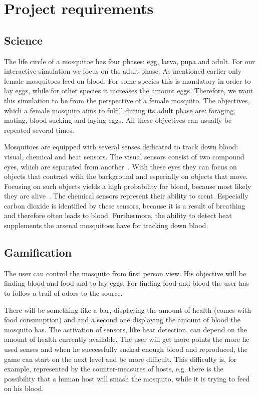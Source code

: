 \documentclass{acm_proc_article-sp}
\begin{document}
\section{Project requirements}

\subsection{Science}
The life circle of a mosquitoe has four phases: egg, larva, pupa and adult. For our interactive simulation we focus on the adult phase. As mentioned earlier only female mosquitoes feed on blood. For some species this is mandatory in order to lay eggs, while for other species it increases the amount eggs. Therefore, we want this simulation to be from the perspective of a female mosquito. The objectives, which a female mosquito aims to fulfill during its adult phase are: foraging, mating, blood sucking and laying eggs. All these objectives can usually be repeated several times.

Mosquitoes are equipped with several senses dedicated to track down blood: visual, chemical and heat sensors. The visual sensors consist of two compound eyes, which are separated from another~\cite{wiki_mosq}. With these eyes they can focus on objects that contrast with the background and especially on objects that move. Focusing on such objects yields a high probability for blood, because most likely they are alive~\cite{howstuff}. The chemical sensors represent their ability to scent. Especially carbon dioxide is identified by these sensors, because it is a result of breathing and therefore often leads to blood. Furthermore, the ability to detect heat supplements the arsenal mosquitoes have for tracking down blood.

\subsection{Gamification}
The user can control the mosquito from first person view. His objective will be finding blood and food and to lay eggs. For finding food and blood the user has to follow a trail of odors to the source.

There will be something like a bar, displaying the amount of health (comes with food consumption) and and a second one displaying the amount of blood the mosquito has. The activation of sensors, like heat detection, can depend on the amount of health currently available. The user will get more points the more he used senses and when he successfully sucked enough blood and reproduced, the game can start on the next level and be more difficult. This difficulty is, for example, represented by the counter-measures of hosts, e.g. there is the possibility that a human host will smash the mosquito, while it is trying to feed on his blood.
\end{document}
